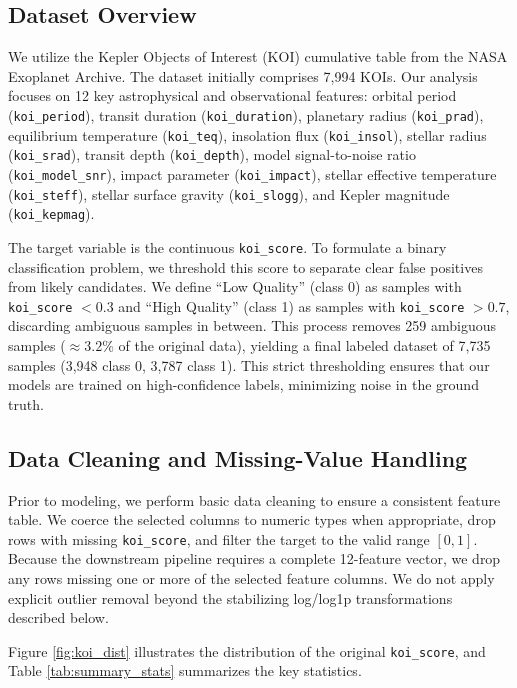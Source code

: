 \subsection{Dataset Overview}
We utilize the Kepler Objects of Interest (KOI) cumulative table from the NASA Exoplanet Archive. The dataset initially comprises 7,994 KOIs. Our analysis focuses on 12 key astrophysical and observational features: orbital period (\texttt{koi\_period}), transit duration (\texttt{koi\_duration}), planetary radius (\texttt{koi\_prad}), equilibrium temperature (\texttt{koi\_teq}), insolation flux (\texttt{koi\_insol}), stellar radius (\texttt{koi\_srad}), transit depth (\texttt{koi\_depth}), model signal-to-noise ratio (\texttt{koi\_model\_snr}), impact parameter (\texttt{koi\_impact}), stellar effective temperature (\texttt{koi\_steff}), stellar surface gravity (\texttt{koi\_slogg}), and Kepler magnitude (\texttt{koi\_kepmag}).

The target variable is the continuous \texttt{koi\_score}. To formulate a binary classification problem, we threshold this score to separate clear false positives from likely candidates. We define ``Low Quality'' (class 0) as samples with \texttt{koi\_score} $< 0.3$ and ``High Quality'' (class 1) as samples with \texttt{koi\_score} $> 0.7$, discarding ambiguous samples in between. This process removes 259 ambiguous samples ($\approx 3.2\%$ of the original data), yielding a final labeled dataset of 7,735 samples (3,948 class 0, 3,787 class 1). This strict thresholding ensures that our models are trained on high-confidence labels, minimizing noise in the ground truth.

\subsection{Data Cleaning and Missing-Value Handling}
Prior to modeling, we perform basic data cleaning to ensure a consistent feature table. We coerce the selected columns to numeric types when appropriate, drop rows with missing \texttt{koi\_score}, and filter the target to the valid range $[0,1]$. Because the downstream pipeline requires a complete 12-feature vector, we drop any rows missing one or more of the selected feature columns. We do not apply explicit outlier removal beyond the stabilizing log/log1p transformations described below.

Figure \ref{fig:koi_dist} illustrates the distribution of the original \texttt{koi\_score}, and Table \ref{tab:summary_stats} summarizes the key statistics.

